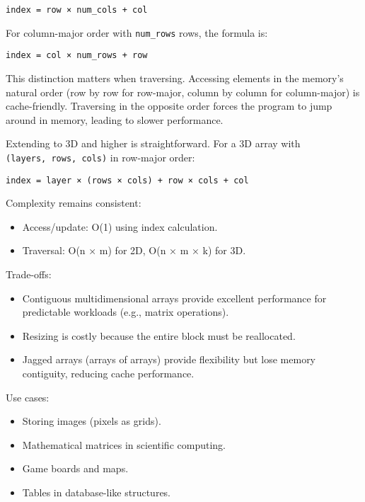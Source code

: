\documentclass[
  letterpaper,
  DIV=11,
  numbers=noendperiod]{scrreprt}
\providecommand{\tightlist}{%
  \setlength{\itemsep}{0pt}\setlength{\parskip}{0pt}}
\begin{document}
\begin{verbatim}
index = row × num_cols + col
\end{verbatim}

For column-major order with \texttt{num\_rows} rows, the formula is:

\begin{verbatim}
index = col × num_rows + row
\end{verbatim}

This distinction matters when traversing. Accessing elements in the
memory's natural order (row by row for row-major, column by column for
column-major) is cache-friendly. Traversing in the opposite order forces
the program to jump around in memory, leading to slower performance.

Extending to 3D and higher is straightforward. For a 3D array with
\texttt{(layers,\ rows,\ cols)} in row-major order:

\begin{verbatim}
index = layer × (rows × cols) + row × cols + col
\end{verbatim}

Complexity remains consistent:

\begin{itemize}
\tightlist
\item
  Access/update: O(1) using index calculation.
\item
  Traversal: O(n × m) for 2D, O(n × m × k) for 3D.
\end{itemize}

Trade-offs:

\begin{itemize}
\tightlist
\item
  Contiguous multidimensional arrays provide excellent performance for
  predictable workloads (e.g., matrix operations).
\item
  Resizing is costly because the entire block must be reallocated.
\item
  Jagged arrays (arrays of arrays) provide flexibility but lose memory
  contiguity, reducing cache performance.
\end{itemize}

Use cases:

\begin{itemize}
\tightlist
\item
  Storing images (pixels as grids).
\item
  Mathematical matrices in scientific computing.
\item
  Game boards and maps.
\item
  Tables in database-like structures.
\end{itemize}
\end{document}
